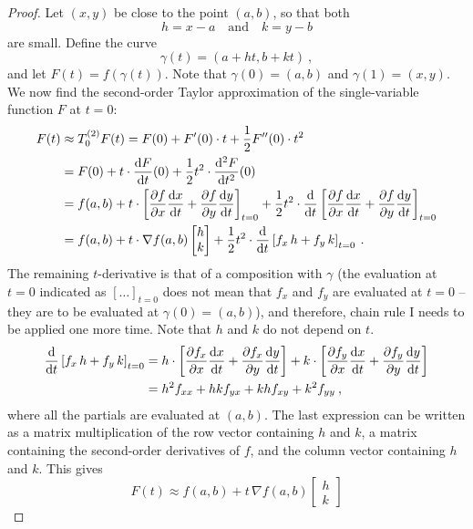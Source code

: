 \begin{proof}
Let $(x,y)$ be close to the point $(a,b)$, so that both
\[ h = x-a \quad \text{and} \quad  k = y-b \]
are small. Define the curve
\[ \gamma(t) = (a+ht,b+kt) \:, \]
and let $F(t) = f(\gamma(t))$. Note that $\gamma(0)=(a,b)$ and $\gamma(1)=(x,y)$. We now find the second-order Taylor approximation of the single-variable function $F$ at $t=0$:
\begin{equation*}
\begin{split}
F(t) & \approx T_0^{(2)}F(t)
= F(0) + F'(0)\cdot t + \frac{1}{2} F''(0)\cdot t^2 \\
& = F(0) + t \cdot \displaystyle{\frac{\mathrm{d}F}{\mathrm{d}t}}(0) + \frac{1}{2}t^2 \cdot \displaystyle{\frac{\mathrm{d}^2 F}{\mathrm{d}t^2}}(0) \\
& = f(a,b) + t \cdot \left[ \displaystyle{\frac{\partial f}{\partial x}}\displaystyle{\frac{\mathrm{d}x}{\mathrm{d}t}} + \displaystyle{\frac{\partial f}{\partial y}}\displaystyle{\frac{\mathrm{d}y}{\mathrm{d}t}} \right]_{t=0}
+ \frac{1}{2} t^2 \cdot \displaystyle{\frac{\mathrm{d}}{\mathrm{d}t}}\left[ \displaystyle{\frac{\partial f}{\partial x}}\displaystyle{\frac{\mathrm{d}x}{\mathrm{d}t}} + \displaystyle{\frac{\partial f}{\partial y}}\displaystyle{\frac{\mathrm{d}y}{\mathrm{d}t}} \right]_{t=0} \\
& = f(a,b) + t \cdot \nabla f (a,b) \begin{bmatrix} h \\ k \end{bmatrix}
+ \frac{1}{2} t^2 \cdot \displaystyle{\frac{\mathrm{d}}{\mathrm{d}t}}\left[ f_x \, h + f_y \, k \right]_{t=0} \:.
\end{split}
\end{equation*}
The remaining $t$-derivative is that of a composition with $\gamma$ (the evaluation at $t=0$ indicated as $[\dots]_{t=0}$ does not mean that $f_x$ and $f_y$ are evaluated at $t=0$ -- they are to be evaluated at $\gamma(0)=(a,b)$), and therefore, chain rule I needs to be applied one more time. Note that $h$ and $k$ do not depend on $t$.
\begin{equation*}
\begin{split}
\displaystyle{\frac{\mathrm{d}}{\mathrm{d}t}} \left[ f_x \, h + f_y \, k \right]_{t=0} 
& = h \cdot \left[ \displaystyle{\frac{\partial f_x}{\partial x}} \displaystyle{\frac{\mathrm{d}x}{\mathrm{d}t}} + \displaystyle{\frac{\partial f_x}{\partial y}} \displaystyle{\frac{\mathrm{d}y}{\mathrm{d}t}} \right] 
+ k \cdot \left[ \displaystyle{\frac{\partial f_y}{\partial x}} \displaystyle{\frac{\mathrm{d}x}{\mathrm{d}t}} + \displaystyle{\frac{\partial f_y}{\partial y}} \displaystyle{\frac{\mathrm{d}y}{\mathrm{d}t}} \right] \\
& = h^2 f_{xx} + hk f_{yx} + kh f_{xy} + k^2 f_{yy} \:,
\end{split}
\end{equation*}
where all the partials are evaluated at $(a,b)$. The last expression can be written as a matrix multiplication of the row vector containing $h$ and $k$, a matrix containing the second-order derivatives of $f$, and the column vector containing $h$ and $k$. This gives
\[
F(t) \approx f(a,b) + t \, \nabla f (a,b) \begin{bmatrix} h \\ k \end{bmatrix} 
\]
\end{proof}
